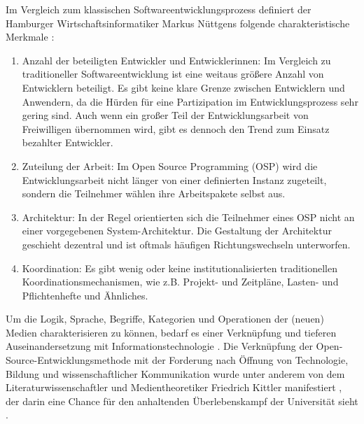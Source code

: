 Im Vergleich zum klassischen Softwareentwicklungsprozess definiert der Hamburger Wirtschaftsinformatiker Markus Nüttgens folgende charakteristische Merkmale \cite{nuttgens_2014}:
\begin{enumerate}
\item Anzahl der beteiligten Entwickler und Entwicklerinnen: Im Vergleich zu traditioneller Softwareentwicklung ist eine weitaus größere Anzahl von Entwicklern beteiligt. Es gibt keine klare Grenze zwischen Entwicklern und Anwendern, da die Hürden für eine Partizipation im Entwicklungsprozess sehr gering sind. Auch wenn ein großer Teil der Entwicklungsarbeit von Freiwilligen übernommen wird, gibt es dennoch den Trend zum Einsatz bezahlter Entwickler.
\item Zuteilung der Arbeit: Im Open Source Programming (OSP) wird die Entwicklungsarbeit nicht länger von einer definierten Instanz zugeteilt, sondern die Teilnehmer wählen ihre Arbeitspakete selbst aus.
\item Architektur: In der Regel orientierten sich die Teilnehmer eines OSP nicht an einer vorgegebenen System-Architektur. Die Gestaltung der Architektur geschieht dezentral und ist oftmals häufigen Richtungswechseln unterworfen.
\item Koordination: Es gibt wenig oder keine institutionalisierten traditionellen Koordinationsmechanismen, wie z.B. Projekt- und Zeitpläne, Lasten- und Pflichtenhefte und Ähnliches.
\end{enumerate}

Um die Logik, Sprache, Begriffe, Kategorien und Operationen der (neuen) Medien charakterisieren zu können, bedarf es einer Verknüpfung und tieferen Auseinandersetzung mit Informationstechnologie \cite[:65]{manovich_2001_language}. Die Verknüpfung der Open-Source-Entwicklungsmethode mit der Forderung nach Öffnung von Technologie, Bildung und wissenschaftlicher Kommunikation wurde unter anderem von dem Literaturwissenschaftler und Medientheoretiker Friedrich Kittler manifestiert \cite{cite:1}, der darin eine Chance für den anhaltenden Überlebenskampf der Universität sieht \cite[:7]{chun_2006_new}.

